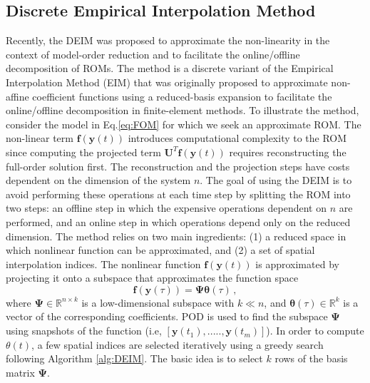 \documentclass[review,number,sort&compress,12pt]{elsarticle}
\begin{document}

\subsection{Discrete Empirical Interpolation Method}

\label{sec:DEIM}
Recently, the DEIM \cite{chaturantabut2010nonlinear} was proposed to approximate the non-linearity in the context of model-order reduction and to facilitate the online/offline decomposition of ROMs.
The method is a discrete variant of the Empirical Interpolation Method (EIM) \cite{barrault2004empirical} that was originally proposed to approximate non-affine coefficient functions using a reduced-basis expansion to facilitate the online/offline decomposition in finite-element methods.
To illustrate the method, consider the model in Eq.\ref{eq:FOM} for which we seek an approximate ROM.
The non-linear term $\mathbf{f}(\textbf{y}(t))$ introduces computational complexity to the ROM since computing the projected term $\mathbf{U}^T\mathbf{f}(\textbf{y}(t))$ requires reconstructing the full-order  solution first.
The reconstruction and the projection steps have costs dependent on the dimension of the system $n$.
The goal of using the DEIM is to avoid performing these operations at each time step by splitting the ROM into two steps: an offline step in which the expensive operations dependent on $n$ are performed, and an online step in which operations depend only on the reduced dimension.
The method relies on two main ingredients: (1) a reduced space in which nonlinear function can be approximated, and (2) a set of spatial interpolation indices.
The nonlinear function $\mathbf{f}(\textbf{y}(t))$ is approximated by projecting it onto a subspace that approximates the function space
\begin{equation}
\mathbf{f}(\textbf{y}(\tau)) = \mathbf{\Psi}\boldsymbol{\theta}(\tau)\, ,
\end{equation}
where $\mathbf{\Psi} \in \mathbb{R}^{n\times k}$ is a low-dimensional subspace with $k \ll n$, and $\boldsymbol{\theta}(\tau) \in \mathbb{R}^k$ is a vector of the corresponding coefficients.
POD is used to find the subspace $\mathbf{\Psi}$ using snapshots of the function (i.e, $[\textbf{y}(t_1), ....., \textbf{y}(t_m)]$).
In order to compute $\theta(t)$, a few spatial indices are selected iteratively using a greedy search following Algorithm \ref{alg:DEIM}.
The basic idea is to select $k$ rows of the basis matrix $\mathbf{\Psi}$.
\end{document}
